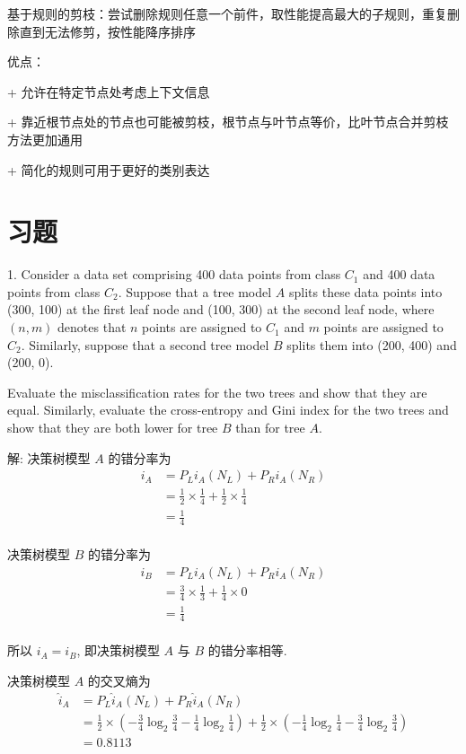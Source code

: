 \documentclass[openany]{ctexbook}
\theoremstyle{kaiti}
\theoremstyle{normal}
\begin{document}
基于规则的剪枝：尝试删除规则任意一个前件，取性能提高最大的子规则，重复删除直到无法修剪，按性能降序排序

优点：

+ 允许在特定节点处考虑上下文信息

+ 靠近根节点处的节点也可能被剪枝，根节点与叶节点等价，比叶节点合并剪枝方法更加通用

+ 简化的规则可用于更好的类别表达

\section{习题}

1. Consider a data set comprising 400 data points from class $C_1$ and 400 data points from class $C_2$. Suppose that a tree model $A$ splits these data points into (300, 100) at the first leaf node and (100, 300) at the second leaf node, where $(n, m)$ denotes that $n$ points are assigned to $C_1$ and $m$ points are assigned to $C_2$. Similarly, suppose that a second tree model $B$ splits them into (200, 400) and (200, 0).

Evaluate the misclassification rates for the two trees and show that they are equal. Similarly, evaluate the cross-entropy and Gini index for the two trees and show that they are both lower for tree $B$ than for tree $A$.

解: 决策树模型 $A$ 的错分率为
\begin{equation}
  \begin{aligned}
    i_A
    &=P_Li_A(N_L)+P_Ri_A(N_R)\\
    &=\frac{1}{2}\times\frac{1}{4}+\frac{1}{2}\times\frac{1}{4}\\
    &=\frac{1}{4}\\
  \end{aligned}
\end{equation}

决策树模型 $B$ 的错分率为
\begin{equation}
  \begin{aligned}
    i_B
    &=P_Li_A(N_L)+P_Ri_A(N_R)\\
    &=\frac{3}{4}\times\frac{1}{3}+\frac{1}{4}\times0\\
    &=\frac{1}{4}\\
  \end{aligned}
\end{equation}

所以 $i_A=i_B$, 即决策树模型 $A$ 与 $B$ 的错分率相等.

决策树模型 $A$ 的交叉熵为
\begin{equation}
  \begin{aligned}
    \hat{i}_A
    &=P_L\hat{i}_A(N_L)+P_R\hat{i}_A(N_R)\\
    &=\frac{1}{2}\times\left(-\frac{3}{4}\log_2\frac{3}{4}-\frac{1}{4}\log_2\frac{1}{4}\right)+\frac{1}{2}\times\left(-\frac{1}{4}\log_2\frac{1}{4}-\frac{3}{4}\log_2\frac{3}{4}\right)\\
    &=0.8113\\
  \end{aligned}
\end{equation}
\end{document}
